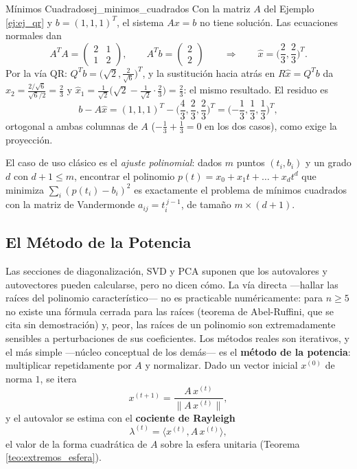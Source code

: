 \documentclass[11pt, a4paper]{article}
\begin{document}
\begin{ejemplo}{Mínimos Cuadrados}{ej_minimos_cuadrados}
Con la matriz $A$ del Ejemplo \ref{ej:ej_qr} y $b = (1, 1, 1)^T$, el sistema $Ax = b$ no tiene solución. Las ecuaciones normales dan
\[
A^T A = \begin{pmatrix} 2 & 1 \\ 1 & 2 \end{pmatrix}, \qquad A^T b = \begin{pmatrix} 2 \\ 2 \end{pmatrix}
\qquad \Longrightarrow \qquad \hat{x} = \Big( \frac{2}{3}, \frac{2}{3} \Big)^T.
\]
Por la vía QR: $Q^T b = \big( \sqrt{2}, \frac{2}{\sqrt{6}} \big)^T$, y la sustitución hacia atrás en $R \hat{x} = Q^T b$ da $\hat{x}_2 = \frac{2/\sqrt{6}}{\sqrt{6}/2} = \frac{2}{3}$ y $\hat{x}_1 = \frac{1}{\sqrt{2}} \big( \sqrt{2} - \frac{1}{\sqrt{2}} \cdot \frac{2}{3} \big) = \frac{2}{3}$: el mismo resultado. El residuo es
\[
b - A\hat{x} = (1,1,1)^T - \Big( \frac{4}{3}, \frac{2}{3}, \frac{2}{3} \Big)^T = \Big( {-\frac{1}{3}}, \frac{1}{3}, \frac{1}{3} \Big)^T,
\]
ortogonal a ambas columnas de $A$ ($-\frac{1}{3} + \frac{1}{3} = 0$ en los dos casos), como exige la proyección.
\end{ejemplo}

\obs El caso de uso clásico es el \emph{ajuste polinomial}: dados $m$ puntos $(t_i, b_i)$ y un grado $d$ con $d + 1 \le m$, encontrar el polinomio $p(t) = x_0 + x_1 t + \dots + x_d t^d$ que minimiza $\sum_i (p(t_i) - b_i)^2$ es exactamente el problema de mínimos cuadrados con la matriz de Vandermonde $a_{ij} = t_i^{\, j-1}$, de tamaño $m \times (d+1)$.

\subsection{El Método de la Potencia}

Las secciones de diagonalización, SVD y PCA suponen que los autovalores y autovectores pueden calcularse, pero no dicen cómo. La vía directa —hallar las raíces del polinomio característico— no es practicable numéricamente: para $n \ge 5$ no existe una fórmula cerrada para las raíces (teorema de Abel-Ruffini, que se cita sin demostración) y, peor, las raíces de un polinomio son extremadamente sensibles a perturbaciones de sus coeficientes. Los métodos reales son iterativos, y el más simple —núcleo conceptual de los demás— es el \textbf{método de la potencia}: multiplicar repetidamente por $A$ y normalizar. Dado un vector inicial $x^{(0)}$ de norma $1$, se itera
\[
x^{(t+1)} = \frac{A \, x^{(t)}}{\| A \, x^{(t)} \|},
\]
y el autovalor se estima con el \textbf{cociente de Rayleigh}
\[
\lambda^{(t)} = \langle x^{(t)}, A \, x^{(t)} \rangle,
\]
el valor de la forma cuadrática de $A$ sobre la esfera unitaria (Teorema \ref{teo:extremos_esfera}).
\end{document}

